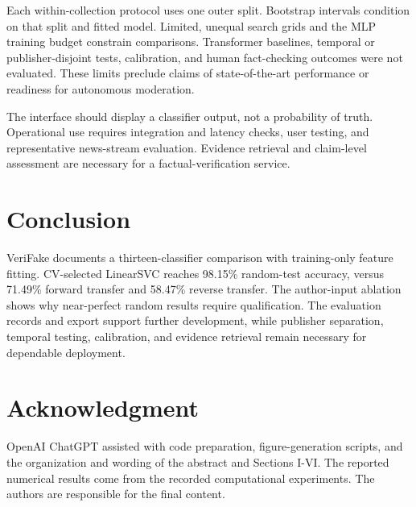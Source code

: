 \documentclass[conference]{IEEEtran}
\begin{document}
Each within-collection protocol uses one outer split. Bootstrap intervals condition on that split and fitted model. Limited, unequal search grids and the MLP training budget constrain comparisons. Transformer baselines, temporal or publisher-disjoint tests, calibration, and human fact-checking outcomes were not evaluated. These limits preclude claims of state-of-the-art performance or readiness for autonomous moderation.

The interface should display a classifier output, not a probability of truth. Operational use requires integration and latency checks, user testing, and representative news-stream evaluation. Evidence retrieval and claim-level assessment are necessary for a factual-verification service.

\section{Conclusion}
VeriFake documents a thirteen-classifier comparison with training-only feature fitting. CV-selected LinearSVC reaches 98.15\% random-test accuracy, versus 71.49\% forward transfer and 58.47\% reverse transfer. The author-input ablation shows why near-perfect random results require qualification. The evaluation records and export support further development, while publisher separation, temporal testing, calibration, and evidence retrieval remain necessary for dependable deployment.

\section*{Acknowledgment}
OpenAI ChatGPT assisted with code preparation, figure-generation scripts, and the organization and wording of the abstract and Sections I-VI. The reported numerical results come from the recorded computational experiments. The authors are responsible for the final content.
\end{document}
